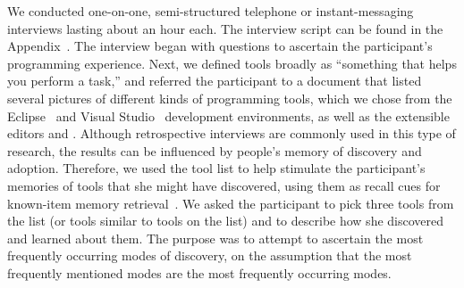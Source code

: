\documentclass[smallextended]{svjour3}
\newcommand\contexts{modes\xspace}
\begin{document}
\noindent
We conducted one-on-one, semi-structured telephone or
instant-messaging interviews lasting about an hour each.
The interview script can be found in the Appendix~\citep{appendix}.
The interview began with questions to ascertain the
participant's programming experience.
Next, we defined tools broadly as 
``something that helps you perform a task,''
and referred the participant to a document that listed several pictures of 
different kinds of programming tools, which we chose from the Eclipse~\citeyearpar{eclipse} and
Visual Studio~\citeyearpar{visualstudio} development environments, 
as well as the extensible editors \citet{vim}
and \citet{emacs}.
Although retrospective interviews are commonly used in this type of research,
the results can be influenced by people's memory of
discovery and adoption. 
Therefore, we used the tool list to help stimulate the participant's memories of
tools that she might have discovered, using them as recall cues for known-item 
memory retrieval~\citep{allen89}.
We asked the participant to pick three tools from the list (or tools
similar to tools on the list) and to describe how she discovered and learned
about them. 
The purpose was to attempt to ascertain the most frequently occurring \contexts
of discovery, on the assumption that the most frequently mentioned \contexts
are the most frequently occurring \contexts.
       
\end{document}
